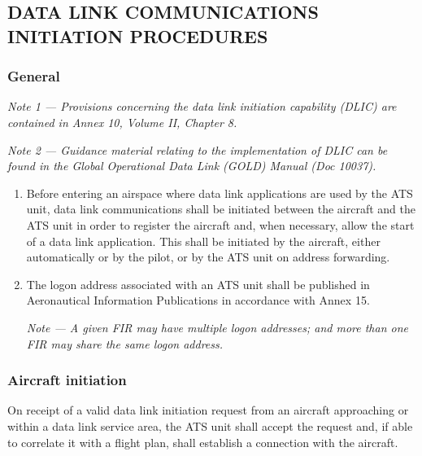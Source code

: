 \documentclass[../main.tex]{subfiles}
\begin{document}
    \subsection[Data link communications initiation procedures]{DATA LINK COMMUNICATIONS INITIATION PROCEDURES}

    \subsubsection{General}

    \begin{enumempty}[labelindent=\parindent]
        \item \textit{Note 1 --- Provisions concerning the data link initiation capability (DLIC) are contained in Annex 10, Volume II, Chapter 8.}
        \item \textit{Note 2 --- Guidance material relating to the implementation of DLIC can be found in the \emph{Global Operational Data Link (GOLD) Manual} (Doc 10037).}
    \end{enumempty}

    \begin{enumerate}        
        \item Before entering an airspace where data link applications are used by the ATS unit, data link communications shall be initiated between the aircraft and the ATS unit in order to register the aircraft and, when necessary, allow the start of a data link application. This shall be initiated by the aircraft, either automatically or by the pilot, or by the ATS unit on address forwarding.
        \item The logon address associated with an ATS unit shall be published in Aeronautical Information Publications in accordance with Annex 15.

        \textit{Note --- A given FIR may have multiple logon addresses; and more than one FIR may share the same logon address.}
    \end{enumerate}

    \subsubsection{Aircraft initiation}

    On receipt of a valid data link initiation request from an aircraft approaching or within a data link service area, the ATS unit shall accept the request and, if able to correlate it with a flight plan, shall establish a connection with the aircraft.
\end{document}

